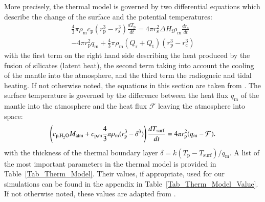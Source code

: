 \documentclass[oneside,twocolumn]{article}
\begin{document}
More precisely, the thermal model is governed by two differential equations which describe the change of the surface and the potential temperatures:
\begin{multline}
	\label{Deriv_Tpot}
	\frac{4}{3} \pi \rho_\mathrm{m} c_\mathrm{p} (r^3_\mathrm{p} - r^3_\mathrm{s}) \frac{dT_\mathrm{p}}{dt}     = 4 \pi r^2_\mathrm{s} \Delta H_\mathrm{f} \rho_\mathrm{m} \frac{dr_\mathrm{s}}{dt} \\ 
	   - 4 \pi r^2_\mathrm{p} q_\mathrm{m} + \frac{4}{3} \pi \rho_\mathrm{m} (Q_\mathrm{r} + Q_\mathrm{t}) (r^3_\mathrm{p} - r^3_\mathrm{c})
\end{multline}
with the first term on the right hand side describing the heat produced by the fusion of silicates (latent heat), the second term taking into account the cooling of the mantle into the atmosphere, and the third term the radiogneic and tidal heating.
If not otherwise noted, the equations in this section are taken from \citet{Schaefer2016}.
The surface temperature is governed by the difference between the heat flux $q_\mathrm{m}$ of the mantle into the atmosphere and the heat flux $\mathcal{F}$ leaving the atmosphere into space:
\begin{equation}
	\label{Deriv_Tsurf}
	\left( c_{\mathrm{p},\ce{H2O}} M_\mathrm{atm} +  c_\mathrm{p,m} \frac{4}{3} \pi \rho_\mathrm{m} (r^3_\mathrm{p} - \delta^3) \right) \frac{dT_\mathrm{surf}}{dt} = 4 \pi r^2_\mathrm{p} (q_\mathrm{m} - \mathcal{F}).
\end{equation}
with the thickness of the thermal boundary layer $\delta = k (T_\mathrm{p} - T_\mathrm{surf}) / q_\mathrm{m}$.
A list of the most important parameters in the thermal model is provided in Table~\ref{Tab_Therm_Model}. Their values, if appropriate, used for our simulations can be found in the appendix in Table~\ref{Tab_Therm_Model_Value}.
If not otherwise noted, these values are adapted from \citet{Schaefer2016}.
\end{document}
